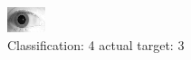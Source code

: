\begin{figure}[h!]
\begin{center}
\includegraphics[width=0.60\columnwidth]{figures/ID1971_class_4_target_3.png}
\end{center}
\caption{ Classification: 4 actual target: 3}
\label{fig:ID1971_class_4_target_3}
\end{figure}
